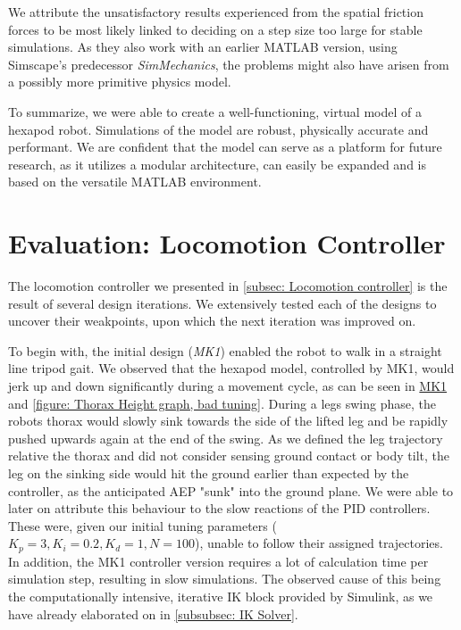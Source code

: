 We attribute the unsatisfactory results \cite{thilderkvist2015motion} experienced from the spatial friction forces to be most likely linked to deciding on a step size too large for stable simulations.
As they also work with an earlier MATLAB version, using Simscape's predecessor \textit{SimMechanics}, the problems might also have arisen from a possibly more primitive physics model.

To summarize, we were able to create a well-functioning, virtual model of a hexapod robot.
Simulations of the model are robust, physically accurate and performant.
We are confident that the model can serve as a platform for future research, as it utilizes a modular architecture, can easily be expanded and is based on the versatile MATLAB environment.
 

\section{Evaluation: Locomotion Controller}
The locomotion controller we presented in \ref{subsec: Locomotion controller} is the result of several design iterations.
We extensively tested each of the designs to uncover their weakpoints, upon which the next iteration was improved on.

To begin with, the initial design (\textit{MK1}) enabled the robot to walk in a straight line tripod gait.
We observed that the hexapod model, controlled by MK1, would jerk up and down significantly during a movement cycle, as can be seen in \hyperref[vid: MK1]{MK1} and \ref{figure: Thorax Height graph, bad tuning}.
During a legs swing phase, the robots thorax would slowly sink towards the side of the lifted leg and be rapidly pushed upwards again at the end of the swing.
As we defined the leg trajectory relative the thorax and did not consider sensing ground contact or body tilt, the leg on the sinking side would hit the ground earlier than expected by the controller, as the anticipated AEP "sunk" into the ground plane.
We were able to later on attribute this behaviour to the slow reactions of the PID controllers.
These were, given our initial tuning parameters ($K_p = 3, K_i = 0.2, K_d = 1, N = 100$), unable to follow their assigned trajectories. 
In addition, the MK1 controller version requires a lot of calculation time per simulation step, resulting in slow simulations.
The observed cause of this being the computationally intensive, iterative IK block provided by Simulink, as we have already elaborated on in \ref{subsubsec: IK Solver}.

